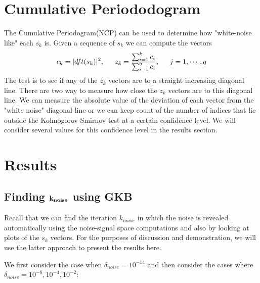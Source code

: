 \documentclass[11pt]{amsart}
\begin{document}
\section{Cumulative Periododogram}
The Cumulative Periodogram(NCP) can be used to determine how "white-noise like" 
each $s_k$ is. Given a sequence of $s_k$ we can compute the vectors
$$c_k = |dft(s_k)|^2, \indent z_k = \frac{\sum_{i=1}^k c_i}{ \sum_{i=1}^q c_i}, \indent j=1,\cdots, q$$ 
The test is to see if any of the $z_k$ vectors are to a straight increasing diagonal line. There are two 
way to measure how close the $z_k$ vectors are to this diagonal line. We can measure the 
absolute value of the deviation of each vector from the "white noise" diagonal line or we can keep
count of the number of indices that lie outside the Kolmogorov-Smirnov test at a certain confidence 
level. We will consider several values for this confidence level in the results section.

\section{Results}

\subsection{Finding $\bf k_{noise}$ using GKB}
	Recall that we can find the iteration $k_{noise}$ in which the noise is revealed automatically
	using the noise-signal space computations and also by looking at plots of the $s_k$ vectors.
	For the purposes of discussion and demonstration, we will use the latter approach to present
	the results here.

	We first consider the case when $\delta_{noise}=10^{-14}$ and then consider the cases
	where $\delta_{noise} = 10^{-8},10^{-4},10^{-2}$:
\end{document}

